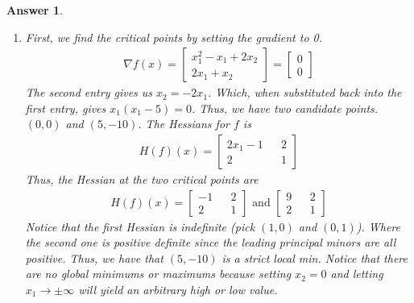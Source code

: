 \documentclass[12pt]{article}
\theoremstyle{colon}
\newtheorem*{answer}{Answer}
\begin{document}
\begin{answer}
  \leavevmode
  \begin{enumerate}[label=\arabic*)]
    \item First, we find the critical points by setting the gradient to 0.
      \begin{gather*}
        \nabla f(x) = \begin{bmatrix}
          x_1^2 - x_1 + 2 x_2 \\
          2 x_1 + x_2
        \end{bmatrix} = \begin{bmatrix}
          0 \\
          0
        \end{bmatrix}
      \end{gather*}
      The second entry gives us $x_2 = -2 x_1$. Which, when substituted back into the first entry, gives $x_1 (x_1 - 5) = 0$. Thus, we have two candidate points. $(0,0)$ and $(5, -10)$. The Hessians for $f$ is
      \begin{gather*}
        H(f)(x) = \begin{bmatrix}
          2 x_1 - 1 && 2 \\
          2 && 1
        \end{bmatrix}
      \end{gather*}
      Thus, the Hessian at the two critical points are
      \begin{gather*}
        H(f)(x) = \begin{bmatrix}
          -1 && 2 \\
          2 && 1
        \end{bmatrix} \text{ and } \begin{bmatrix}
          9 && 2 \\
          2 && 1
        \end{bmatrix}
      \end{gather*}
      Notice that the first Hessian is indefinite (pick $(1,0)$ and $(0,1)$). Where the second one is positive definite since the leading principal minors are all positive. Thus, we have that $(5, -10)$ is a strict local min. Notice that there are no global minimums or maximums because setting $x_2 = 0$ and letting $x_1 \rightarrow \pm \infty$ will yield an arbitrary high or low value.


\end{enumerate}
\end{answer}
\end{document}
